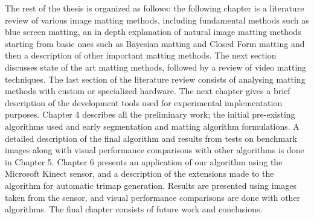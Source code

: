 The rest of the thesis is organized as follows: the following chapter is a literature review of various image matting methods, including fundamental methods such as blue screen matting, an in depth explanation of natural image matting methods starting from basic ones such as Bayesian matting and Closed Form matting and then a description of other important matting methods. The next section discusses state of the art matting methods, followed by a review of video matting techniques. The last section of the literature review consists of analysing matting methods with custom or specialized hardware. The next chapter gives a brief description of the development tools used for experimental implementation purposes. Chapter 4 describes all the preliminary work; the initial pre-existing algorithms used and early segmentation and matting algorithm formulations. A detailed description of the final algorithm and results from tests on benchmark images along with visual performance comparisons with other algorithms is done in Chapter 5. Chapter 6 presents an application of our algorithm using the Microsoft Kinect sensor, and a description of the extensions made to the algorithm for automatic trimap generation. Results are presented using images taken from the sensor, and visual performance comparisons are done with other algorithms. The final chapter consists of future work and conclusions.